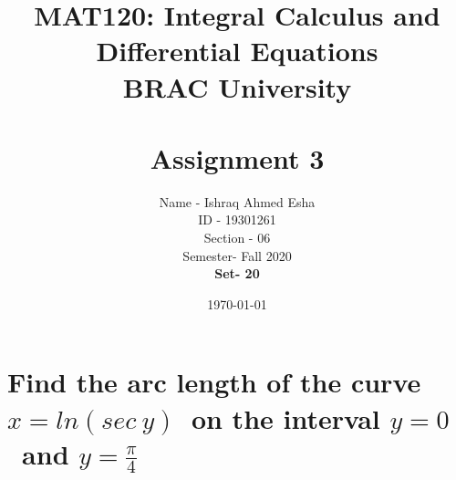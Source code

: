 \documentclass[12pt]{article}
\begin{document}
\title{MAT120: Integral Calculus and
Differential Equations \\
BRAC University \\\\
\textbf{Assignment 3}}

\author{Name - Ishraq Ahmed Esha \\ ID - 19301261 \\ Section - 06 \\ Semester- Fall 2020 \\ \textbf{Set- 20}}
\date{\today}
\maketitle
\pagebreak



\section{Find the arc length of the curve $x=ln(sec\ y)$\ on the interval $y=0$\ and $y=\frac{\pi}{4}$}


\end{document}
